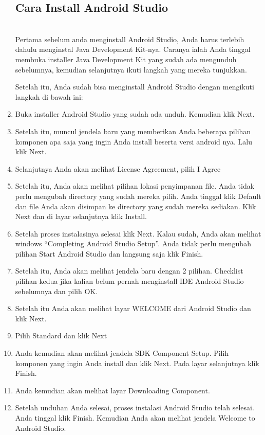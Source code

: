 \begin{enumerate}
\subsection{Cara Install Android Studio}\\
Pertama sebelum anda menginstall Android Studio, Anda harus terlebih dahulu menginstal Java Development Kit-nya. Caranya ialah Anda tinggal membuka installer Java Development Kit yang sudah ada mengunduh sebelumnya, kemudian selanjutnya ikuti langkah yang mereka tunjukkan.

Setelah itu, Anda sudah bisa menginstall Android Studio dengan mengikuti langkah di bawah ini:
\item Buka installer Android Studio yang sudah ada unduh. Kemudian klik Next.
\item Setelah itu, muncul jendela baru yang memberikan Anda beberapa pilihan komponen apa saja yang ingin Anda install beserta versi android nya. Lalu klik Next.
\item Selanjutnya Anda akan melihat License Agreement, pilih I Agree
\item Setelah itu, Anda akan melihat pilihan lokasi penyimpanan file. Anda tidak perlu mengubah directory yang sudah mereka pilih. Anda tinggal klik Default dan file Anda akan disimpan ke directory yang sudah mereka sediakan. Klik Next dan di layar selanjutnya klik Install.
\item Setelah proses instalasinya selesai klik Next. Kalau sudah, Anda akan melihat windows “Completing Android Studio Setup”. Anda tidak perlu mengubah pilihan Start Android Studio dan langsung saja klik Finish.
\item Setelah itu, Anda akan melihat jendela baru dengan 2 pilihan. Checklist pilihan kedua jika kalian belum pernah menginstall IDE Android Studio sebelumnya dan pilih OK.
\item Setelah itu Anda akan melihat layar WELCOME dari Android Studio dan klik Next.
\item Pilih Standard dan klik Next
\item Anda kemudian akan melihat jendela SDK Component Setup. Pilih komponen yang ingin Anda install dan klik Next. Pada layar selanjutnya klik Finish.
\item Anda kemudian akan melihat layar Downloading Component.
\item Setelah unduhan Anda selesai, proses instalasi Android Studio telah selesai. Anda tinggal klik Finish. Kemudian Anda akan melihat jendela Welcome to Android Studio.
\end{enumerate}


